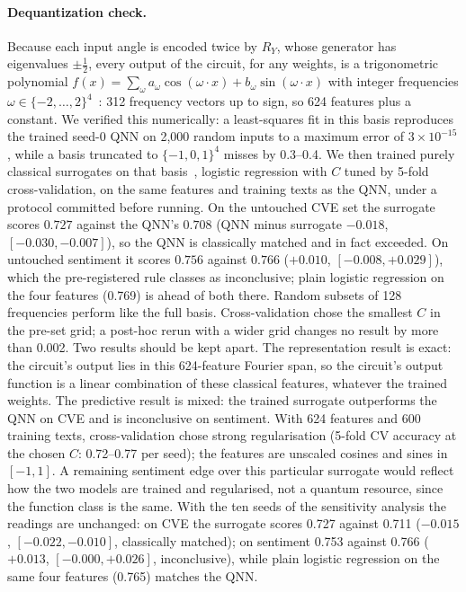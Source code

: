 \documentclass[11pt]{article}
\begin{document}
\paragraph{Dequantization check.} Because each input angle is encoded twice by $R_Y$, whose generator has eigenvalues $\pm\tfrac12$, every output of the circuit, for any weights, is a trigonometric polynomial $f(x) = \sum_{\omega} a_\omega \cos(\omega \cdot x) + b_\omega \sin(\omega \cdot x)$ with integer frequencies $\omega \in \{-2,\dots,2\}^4$~\cite{schuld2021encoding}: 312 frequency vectors up to sign, so 624 features plus a constant. We verified this numerically: a least-squares fit in this basis reproduces the trained seed-0 QNN on 2{,}000 random inputs to a maximum error of $3 \times 10^{-15}$, while a basis truncated to $\{-1,0,1\}^4$ misses by 0.3--0.4. We then trained purely classical surrogates on that basis~\cite{landman2022rff}, logistic regression with $C$ tuned by 5-fold cross-validation, on the same features and training texts as the QNN, under a protocol committed before running. On the untouched CVE set the surrogate scores $0.727$ against the QNN's $0.708$ (QNN minus surrogate $-0.018$, $[-0.030, -0.007]$), so the QNN is classically matched and in fact exceeded. On untouched sentiment it scores $0.756$ against $0.766$ ($+0.010$, $[-0.008, +0.029]$), which the pre-registered rule classes as inconclusive; plain logistic regression on the four features (0.769) is ahead of both there. Random subsets of 128 frequencies perform like the full basis. Cross-validation chose the smallest $C$ in the pre-set grid; a post-hoc rerun with a wider grid changes no result by more than 0.002. Two results should be kept apart. The representation result is exact: the circuit's output lies in this 624-feature Fourier span, so the circuit's output function is a linear combination of these classical features, whatever the trained weights. The predictive result is mixed: the trained surrogate outperforms the QNN on CVE and is inconclusive on sentiment. With 624 features and 600 training texts, cross-validation chose strong regularisation (5-fold CV accuracy at the chosen $C$: 0.72--0.77 per seed); the features are unscaled cosines and sines in $[-1, 1]$. A remaining sentiment edge over this particular surrogate would reflect how the two models are trained and regularised, not a quantum resource, since the function class is the same. With the ten seeds of the sensitivity analysis the readings are unchanged: on CVE the surrogate scores 0.727 against 0.711 ($-0.015$, $[-0.022, -0.010]$, classically matched); on sentiment 0.753 against 0.766 ($+0.013$, $[-0.000, +0.026]$, inconclusive), while plain logistic regression on the same four features (0.765) matches the QNN.
\end{document}
